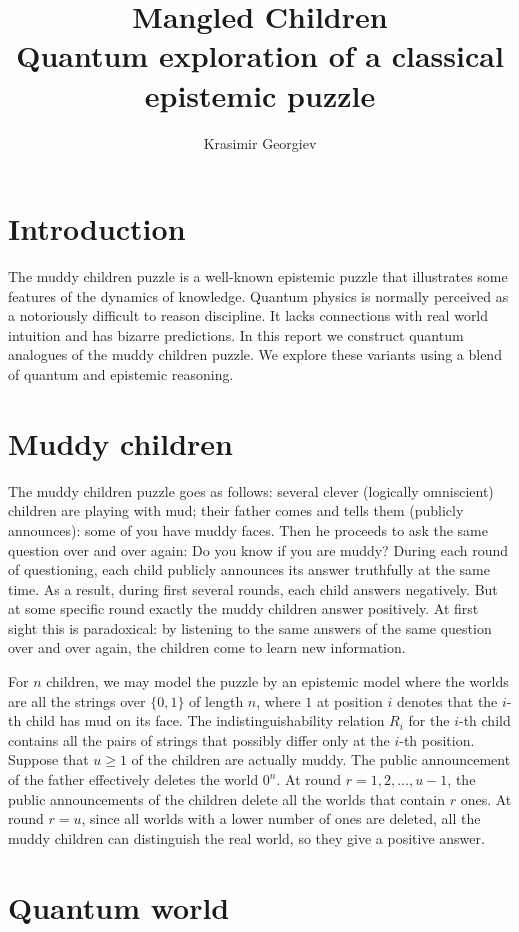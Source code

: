 \documentclass[a4paper]{article}
\title{Mangled Children \\ \large Quantum exploration of a classical epistemic
 puzzle}
\author{Krasimir Georgiev}
\begin{document}
\maketitle
\section*{Introduction} The muddy children puzzle is a well-known epistemic
puzzle that illustrates some features of the dynamics of knowledge. 
Quantum physics is normally perceived as a notoriously difficult to reason
discipline. It lacks connections with real world intuition and has bizarre
predictions. In this report we construct quantum analogues of the muddy
children puzzle. We explore these variants using a blend of quantum and
epistemic reasoning.

\section*{Muddy children} The  muddy children puzzle goes as follows: several
clever (logically omniscient) children are playing with mud; their father comes
and tells them (publicly announces): some of you have muddy faces.  Then he
proceeds to ask the same question over and over again: Do you know if you are
muddy? During each round of questioning, each child publicly announces its
answer truthfully at the same time. As a result, during first several rounds,
each child answers negatively. But at some specific round exactly the muddy
children answer positively. At first sight this is paradoxical: by listening to
the same answers of the same question over and over again, the children come to
learn new information.

For $n$ children, we may model the puzzle by an epistemic model where the worlds
are all the strings over $\{0, 1\}$ of length $n$, where $1$ at position $i$
denotes that the $i$-th child has mud on its face.  The indistinguishability
relation $R_i$ for the $i$-th child contains all the pairs of strings that
possibly differ only at the $i$-th position.  Suppose that $u \geq 1$ of the
children are actually muddy. The public announcement of the father effectively
deletes the world $0^n$. At round $r = 1, 2, \dots, u-1$, the public
announcements of the children delete all the worlds that contain $r$ ones. At
round $r = u$, since all worlds with a lower number of ones are deleted, all the
muddy children can distinguish the real world, so they give a positive answer.

\section*{Quantum world}
\end{document}
